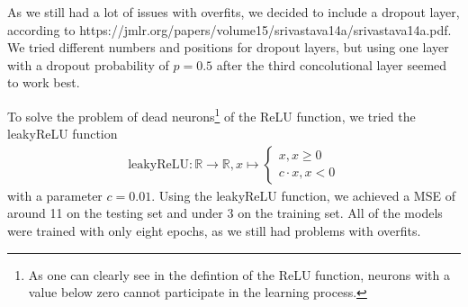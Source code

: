 \documentclass[conference]{IEEEtran}
\begin{document}
As we still had a lot of issues with overfits, we decided to include a dropout layer, according to https://jmlr.org/papers/volume15/srivastava14a/srivastava14a.pdf. We tried different numbers and positions for dropout layers, but using one layer with a dropout 
probability of $p=0.5$ after the third concolutional layer seemed to work best.

To solve the problem of dead neurons\footnote{As one can clearly see in the defintion of the ReLU 
function, neurons with a value below zero cannot participate in the learning process.} of the ReLU function, we 
tried the leakyReLU function
\begin{align*}
\mathrm{leakyReLU} : \mathbb{R} \to \mathbb{R}, x \mapsto \begin{cases}
x, x \geq 0\\
c \cdot x, x <0
\end{cases}
\end{align*}
with a parameter $c = 0.01$. Using the leakyReLU function, we achieved a MSE of around 11 on the testing set and under 3 on the 
training set. All of the models were trained with only eight epochs, as we still had problems with overfits.
\end{document}
